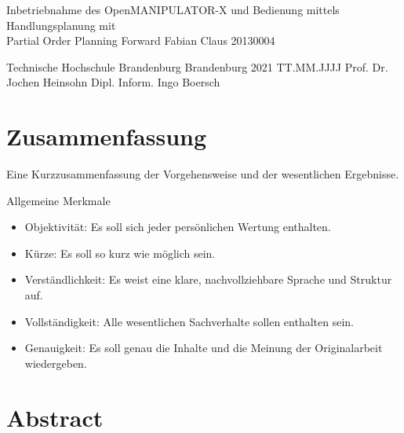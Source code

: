 



  \JMUTitle
      {Inbetriebnahme des OpenMANIPULATOR-X und Bedienung mittels Handlungsplanung mit\\ Partial Order Planning Forward}        %
      {Fabian Claus}                        %
      {20130004}
      
      {Technische Hochschule Brandenburg}  %
      {Brandenburg 2021}                          %
      {TT.MM.JJJJ}                              %
      {Prof. Dr. Jochen Heinsohn}               %
      {Dipl. Inform. Ingo Boersch}                          %

  \clearpage

\lhead{}
    \setcounter{page}{1}

\tableofcontents
\clearpage

\section*{Zusammenfassung}

Eine Kurzzusammenfassung der Vorgehensweise und der wesentlichen Ergebnisse.

Allgemeine Merkmale
\begin{itemize}
    \item Objektivität: Es soll sich jeder persönlichen Wertung enthalten.
    \item Kürze: Es soll so kurz wie möglich sein.
    \item Verständlichkeit: Es weist eine klare, nachvollziehbare Sprache und Struktur auf.
    \item Vollständigkeit: Alle wesentlichen Sachverhalte sollen enthalten sein.
    \item Genauigkeit: Es soll genau die Inhalte und die Meinung der Originalarbeit wiedergeben.
\end{itemize}{}

\newpage
{}
\section*{Abstract}

